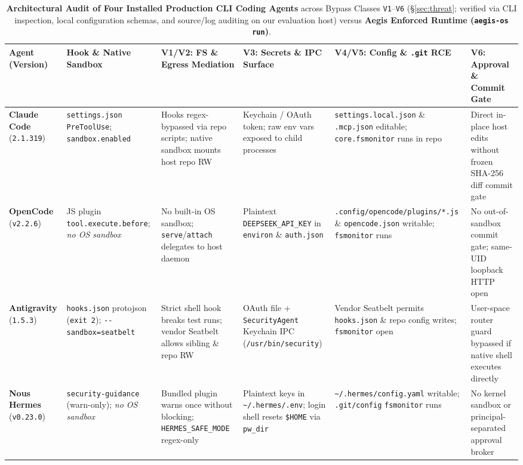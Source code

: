 \documentclass[10pt,twocolumn]{article}
\begin{document}
\begin{table}[!t]
\centering
\caption{\textbf{Architectural Audit of Four Installed Production CLI Coding Agents} across Bypass Classes \texttt{V1}--\texttt{V6} (\S\ref{sec:threat}; verified via CLI inspection, local configuration schemas, and source/log auditing on our evaluation host) versus \textbf{Aegis Enforced Runtime (\texttt{aegis-os run})}.}
\label{tab:agent_audit}
\vspace{2pt}
\scriptsize
\setlength{\tabcolsep}{3.1pt}
\begin{tabularx}{\textwidth}{@{}l>{\raggedright\arraybackslash}p{2.62cm}YYYY@{}}
\toprule
\textbf{Agent (Version)} & \textbf{Hook \& Native Sandbox} & \textbf{V1/V2: FS \& Egress Mediation} & \textbf{V3: Secrets \& IPC Surface} & \textbf{V4/V5: Config \& \texttt{.git} RCE} & \textbf{V6: Approval \& Commit Gate} \\
\midrule
\textbf{Claude Code} (\texttt{2.1.319}) & \texttt{settings.json} \texttt{PreToolUse}; \texttt{sandbox.enabled}~\cite{anthropic2025srt} & Hooks regex-bypassed via repo scripts; native sandbox mounts host repo RW & Keychain / OAuth token; raw env vars exposed to child processes & \texttt{settings.local.json} \& \texttt{.mcp.json} editable; \texttt{core.fsmonitor} runs in repo & Direct in-place host edits without frozen SHA-256 diff commit gate \\
\addlinespace[2pt]
\textbf{OpenCode} (\texttt{v2.2.6}) & JS plugin \texttt{tool.\allowbreak execute.\allowbreak before}; \emph{no OS sandbox} & No built-in OS sandbox; \texttt{serve}/\texttt{attach} delegates to host daemon & Plaintext \texttt{DEEPSEEK\_API\_KEY} in \texttt{environ} \& \texttt{auth.json} & \texttt{.config/opencode/\allowbreak plugins/*.js} \& \texttt{opencode.json} writable; \texttt{fsmonitor} runs & No out-of-sandbox commit gate; same-UID loopback HTTP open \\
\addlinespace[2pt]
\textbf{Antigravity} (\texttt{1.5.3}) & \texttt{hooks.json} protojson (\texttt{exit 2}); \texttt{-\/-sandbox=seatbelt} & Strict shell hook breaks test runs; vendor Seatbelt allows sibling \& repo RW & OAuth file + \texttt{SecurityAgent} Keychain IPC (\texttt{/usr/bin/security}) & Vendor Seatbelt permits \texttt{hooks.json} \& repo config writes; \texttt{fsmonitor} open & User-space router guard bypassed if native shell executes directly \\
\addlinespace[2pt]
\textbf{Nous Hermes} (\texttt{v0.23.0}) & \texttt{security-guidance} (warn-only); \emph{no OS sandbox} & Bundled plugin warns once without blocking; \texttt{HERMES\_SAFE\_MODE} regex-only & Plaintext keys in \texttt{\textasciitilde/.hermes/.env}; login shell resets \texttt{\$HOME} via \texttt{pw\_dir} & \texttt{\textasciitilde/.hermes/\allowbreak config.yaml} writable; \texttt{.git/config} \texttt{fsmonitor} runs & No kernel sandbox or principal-separated approval broker \\

\end{tabularx}
\end{table}
\end{document}
